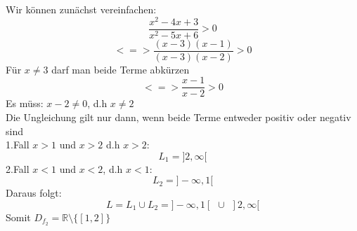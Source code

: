 \documentclass[11pt]{article}
\begin{document}
						Wir können zunächst vereinfachen:
						$$\frac{x^2-4x+3}{x^2-5x+6}>0$$
						$$<=>\frac{(x-3)(x-1)}{(x-3)(x-2)}>0$$
						Für $x \neq 3$ darf man beide Terme abkürzen
						$$<=>\frac{x-1}{x-2}>0$$
						Es müss: $x-2\neq 0$, d.h $x \neq 2$\\
						Die Ungleichung gilt nur dann, wenn beide Terme entweder positiv oder negativ sind\\
						1.Fall $x>1$ und $x>2$ d.h $x>2$:
							$$L_1=]2,\infty[$$
						2.Fall $x<1$ und $x<2$, d.h $x<1$:
							$$L_2=]-\infty,1[$$
						Daraus folgt:\\
						$$L=L_1\cup L_2 = ]-\infty,1[ \hspace{5pt} \cup \hspace{5pt} ]2,\infty[$$
						Somit $D_{f_2}=\mathbb{R}\setminus\{[1,2]\}$						
\end{document}

